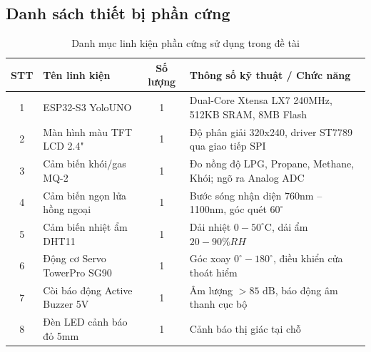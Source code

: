 \subsection{Danh sách thiết bị phần cứng}
\begin{table}[H]
\centering
\caption{Danh mục linh kiện phần cứng sử dụng trong đề tài}
\label{tab:linh_kien}
\begin{tabular}{|c|l|c|p{5.5cm}|}
\hline
\textbf{STT} & \textbf{Tên linh kiện} & \textbf{Số lượng} & \textbf{Thông số kỹ thuật / Chức năng} \\ \hline
1 & ESP32-S3 YoloUNO & 1 & Dual-Core Xtensa LX7 240MHz, 512KB SRAM, 8MB Flash \\ \hline
2 & Màn hình màu TFT LCD 2.4" & 1 & Độ phân giải 320x240, driver ST7789 qua giao tiếp SPI \\ \hline
3 & Cảm biến khói/gas MQ-2 & 1 & Đo nồng độ LPG, Propane, Methane, Khói; ngõ ra Analog ADC \\ \hline
4 & Cảm biến ngọn lửa hồng ngoại & 1 & Bước sóng nhận diện 760nm -- 1100nm, góc quét $60^\circ$ \\ \hline
5 & Cảm biến nhiệt ẩm DHT11 & 1 & Dải nhiệt $0 - 50^\circ\text{C}$, dải ẩm $20 - 90\% RH$ \\ \hline
6 & Động cơ Servo TowerPro SG90 & 1 & Góc xoay $0^\circ - 180^\circ$, điều khiển cửa thoát hiểm \\ \hline
7 & Còi báo động Active Buzzer 5V & 1 & Âm lượng $>85\text{ dB}$, báo động âm thanh cục bộ \\ \hline
8 & Đèn LED cảnh báo đỏ 5mm & 1 & Cảnh báo thị giác tại chỗ \\ \hline
\end{tabular}
\end{table}
\newpage

